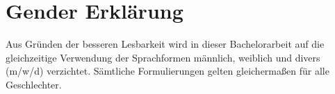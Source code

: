 \section*{Gender Erklärung}

	Aus Gründen der besseren Lesbarkeit wird in dieser Bachelorarbeit auf die gleichzeitige Verwendung der Sprachformen männlich,
	weiblich und divers (m/w/d) verzichtet.
	Sämtliche Formulierungen gelten gleichermaßen für alle Geschlechter.